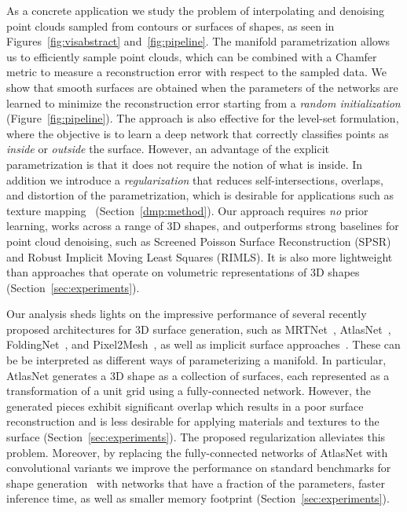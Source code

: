 As a concrete application we study the problem of 
interpolating and denoising point clouds sampled from contours or surfaces of
shapes, as seen in Figures~\ref{fig:visabstract} and~\ref{fig:pipeline}.
The manifold parametrization allows us to efficiently sample point
clouds, which can be combined with a Chamfer metric to measure a
reconstruction error with respect to the sampled data. 
We show that smooth surfaces are obtained when the parameters of the networks are learned to minimize the reconstruction error starting from a \emph{random initialization} (Figure~\ref{fig:pipeline}).
The approach is also effective for the level-set formulation, where the objective is to learn a deep network that correctly classifies points as \emph{inside} or \emph{outside} the surface.
However, an advantage of the explicit parametrization is that it does
not require the notion of what is inside.
In addition we introduce a \emph{regularization} that reduces self-intersections, overlaps, and distortion of the parametrization, which is desirable for applications such as texture mapping ~(Section~\ref{dmp:method}).
Our approach requires \emph{no} prior learning, works across a range of 3D
shapes, and outperforms strong baselines for point cloud denoising, 
such as Screened Poisson Surface Reconstruction (SPSR) and Robust Implicit Moving Least Squares (RIMLS).
It is also more lightweight than approaches that
operate on volumetric representations of 3D shapes (Section~\ref{sec:experiments}).

Our analysis sheds lights on the impressive performance of several
recently proposed architectures for 3D surface generation, such as
MRTNet~\cite{mrt18}, AtlasNet~\cite{atlasnet}, FoldingNet~\cite{yang2018foldingnet}, and Pixel2Mesh~\cite{pixel2mesh}, as well as implicit surface approaches~\cite{chen2019learning,mescheder2019occupancy,genova2019learning,park2019deepsdf}.
These can be be interpreted
as different ways of parameterizing a manifold.
In particular, AtlasNet generates a 3D shape as a collection of surfaces, each represented as a
transformation of a unit grid using a fully-connected network.
However, the generated pieces exhibit significant overlap which
results in a poor surface reconstruction and is less desirable for
applying materials and textures to the surface (Section~\ref{sec:experiments}).
The proposed regularization alleviates this problem. 
Moreover, by replacing the fully-connected networks of AtlasNet with
convolutional variants we improve the performance on standard
benchmarks for shape generation~\cite{choy20163d} with networks that have a
fraction of the parameters, faster inference time, as well
as smaller memory footprint (Section~\ref{sec:experiments}).
